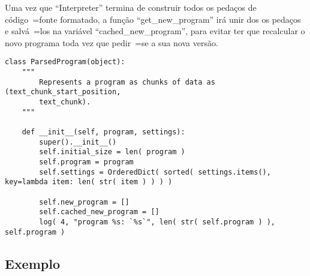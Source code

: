 Uma vez que ``Interpreter'' termina de construir todos os pedaços de código~=fonte formatado,
a função ``get\_new\_program'' irá unir dos os pedaços e
salvá~=los na variável ``cached\_new\_program'',
para evitar ter que recalcular o novo programa toda vez que pedir~=se a sua nova versão.
\begin{lstlisting}[caption={Construtor de ``ParsedProgram''},label={construtorDeParsedProgram},style=mypython]
class ParsedProgram(object):
    """
        Represents a program as chunks of data as (text_chunk_start_position,
        text_chunk).
    """

    def __init__(self, program, settings):
        super().__init__()
        self.initial_size = len( program )
        self.program = program
        self.settings = OrderedDict( sorted( settings.items(), key=lambda item: len( str( item ) ) ) )

        self.new_program = []
        self.cached_new_program = []
        log( 4, "program %s: `%s`", len( str( self.program ) ), self.program )
\end{lstlisting}


\subsection{Exemplo}

